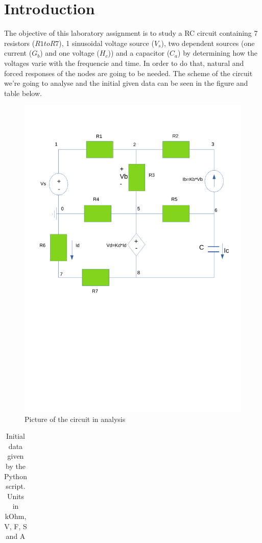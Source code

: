 \section{Introduction}
\label{sec:introduction}

\noindent \par The objective of this laboratory assignment is to study a RC circuit containing 7 resistors ($R1 to R7$), 1 sinusoidal voltage source ($V_s$), two dependent sources (one current ($G_b$) and one voltage ($H_c$)) and a capacitor ($C_a$) by determining how the voltages varie with the frequencie and time. In order to do that, natural and forced responses of the nodes are going to be needed.
The scheme of the circuit we're going to analyse and the initial given data can be seen in the figure and table below.

\begin{figure}[h!] \centering
\includegraphics[width=0.6\linewidth]{Desenho_intro.pdf}
\caption{Picture of the circuit in analysis}
\label{fig:V(t)}
\end{figure}

\begin{table}[h!]
\centering
\begin{tabularx}{0.6 \textwidth} {
  | >{\raggedright\arraybackslash}X
  | >{\raggedleft\arraybackslash}X | }
 \hline
 
\end{tabularx}
\caption{Initial data given by the Python script. Units in kOhm, V, F, S and A}
\end{table}

